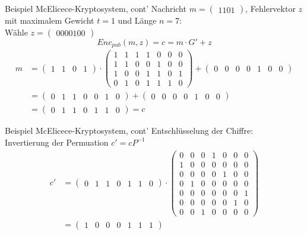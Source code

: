 \documentclass[11pt%
,aspectratio=169%
]{beamer}
\begin{document}
\begin{frame}{Beispiel McElicece-Kryptosystem, cont'}
Nachricht $m = \begin{pmatrix} 1 1 0 1 \end{pmatrix}$, Fehlervektor $z$ mit maximalem Gewicht $t = 1$ und Länge $n = 7$: \\
Wähle $z =  \begin{pmatrix} 0 0 0 0 1 0 0 \end{pmatrix}$ 
$$
    Enc_{pub}(m,z) = c = m \cdot G' + z
$$
\begin{align*}
    m &= \begin{pmatrix} 1 & 1 & 0 & 1 \end{pmatrix} \cdot \begin{pmatrix} 1 & 1 & 1 & 1 & 0 & 0 & 0 \\ 1 & 1 & 0 & 0 & 1 & 0 & 0 \\ 1 & 0 & 0 & 1 & 1 & 0 & 1 \\ 0 & 1 & 0 & 1 & 1 & 1 & 0 \end{pmatrix} + \begin{pmatrix} 0 & 0 & 0 & 0 & 1 & 0 & 0 \end{pmatrix}\\
    &= \begin{pmatrix} 0 & 1 & 1 & 0 & 0 & 1 & 0 \end{pmatrix} + \begin{pmatrix} 0 & 0 & 0 & 0 & 1 & 0 & 0 \end{pmatrix}\\
    &= \begin{pmatrix} 0 & 1 & 1 & 0 & 1 & 1 & 0 \end{pmatrix}=c    
\end{align*}
\end{frame}

\begin{frame}{Beispiel McElicece-Kryptosystem, cont'}
Entschlüsselung der Chiffre:\\
Invertierung der Permuation $c' = cP^{-1}$
\begin{align*}
       c' &= \begin{pmatrix} 0 & 1 & 1 & 0 & 1 & 1 & 0 \end{pmatrix} \cdot \begin{pmatrix} 0 & 0 & 0 & 1 & 0 & 0 & 0 \\ 1 & 0 & 0 & 0 & 0 & 0 & 0 \\ 0 & 0 & 0 & 0 & 1 & 0 & 0 \\ 0 & 1 & 0 & 0 & 0 & 0 & 0 \\ 0 & 0 & 0 & 0 & 0 & 0 & 1 \\ 0 & 0 & 0 & 0 & 0 & 1 & 0 \\ 0 & 0 & 1 & 0 & 0 & 0 & 0 \end{pmatrix}\\
       &= \begin{pmatrix} 1 & 0 & 0 & 0 & 1 & 1 & 1 \end{pmatrix}
\end{align*}
\end{frame}
\end{document}
